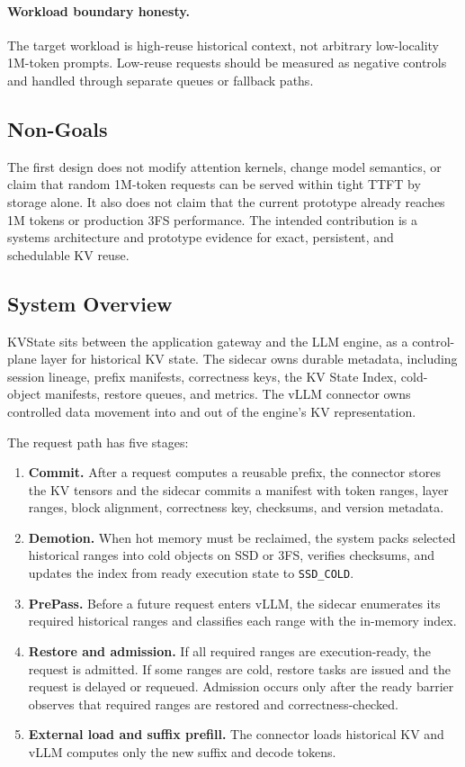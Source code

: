 \documentclass[sigconf,review,anonymous]{acmart}
\newcommand{\system}{KVState\xspace}
\begin{document}
\paragraph{Workload boundary honesty.} The target workload is high-reuse
historical context, not arbitrary low-locality 1M-token prompts. Low-reuse
requests should be measured as negative controls and handled through separate
queues or fallback paths.

\subsection{Non-Goals}

The first design does not modify attention kernels, change model semantics, or
claim that random 1M-token requests can be served within tight TTFT by storage
alone. It also does not claim that the current prototype already reaches 1M
tokens or production 3FS performance. The intended contribution is a systems
architecture and prototype evidence for exact, persistent, and schedulable KV
reuse.

\subsection{System Overview}

\system sits between the application gateway and the LLM engine, as a
control-plane layer for historical KV state. The sidecar owns durable metadata,
including session lineage, prefix manifests, correctness keys, the KV State
Index, cold-object manifests, restore queues, and metrics. The vLLM connector
owns controlled data movement into and out of the engine's KV representation.

The request path has five stages:
\begin{enumerate}[leftmargin=*]
  \item \textbf{Commit.} After a request computes a reusable prefix, the
  connector stores the KV tensors and the sidecar commits a manifest with token
  ranges, layer ranges, block alignment, correctness key, checksums, and
  version metadata.
  \item \textbf{Demotion.} When hot memory must be reclaimed, the system packs
  selected historical ranges into cold objects on SSD or 3FS, verifies
  checksums, and updates the index from ready execution state to
  \texttt{SSD\_COLD}.
  \item \textbf{PrePass.} Before a future request enters vLLM, the sidecar
  enumerates its required historical ranges and classifies each range with the
  in-memory index.
  \item \textbf{Restore and admission.} If all required ranges are
  execution-ready, the request is admitted. If some ranges are cold, restore
  tasks are issued and the request is delayed or requeued. Admission occurs
  only after the ready barrier observes that required ranges are restored and
  correctness-checked.
  \item \textbf{External load and suffix prefill.} The connector loads
  historical KV and vLLM computes only the new suffix and decode tokens.
\end{enumerate}
\end{document}
